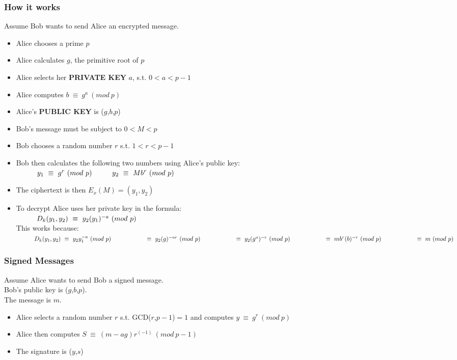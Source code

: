 \documentclass{article}
\newcommand\tabOne[1][1cm]{\hspace*{#1}}
\newcommand\tabTwo[1][2cm]{\hspace*{#1}}
\begin{document}
	\subsubsection{How it works}
	Assume Bob wants to send Alice an encrypted message.
	\begin{itemize}
		\item Alice chooses a prime $p$
		\item Alice calculates $g$, the primitive root of $p$
		\item Alice selects her \textbf{PRIVATE KEY} $a$, s.t. $0<a<p-1$
		\item Alice computes $b~\equiv~g^a~(mod~p)$
		\item Alice's \textbf{PUBLIC KEY} is ($g$,$b$,$p$)
		\item Bob's message must be subject to $0<M<p$
		\item Bob chooses a random number $r$ s.t. $1<r<p-1$
		\item Bob then calculates the following two numbers using Alice's public key:\\
			$
				\tabOne y_1~\equiv~g^r~(mod~p)\\
				\tabOne y_2~\equiv~Mb^r~(mod~p)\\
			$\\
		\item The ciphertext is then $E_x(M)=(y_1,y_2)$
		\item To decrypt Alice uses her private key in the formula:\\
			$
				\tabOne D_k(y_1,y_2)~\equiv~y_2(y_1)^{-a}~(mod~p)\\
			$\\
			This works because:\\
			$
				\tabOne D_k(y_1,y_2)~\equiv~y_2y_1^{-a}~(mod~p)\\
				\tabTwo \equiv~y_2(g)^{-ar}~(mod~p)\\
				\tabTwo \equiv~y_2(g^a)^{-r}~(mod~p)\\
				\tabTwo \equiv~mb^r(b)^{-r}~(mod~p)\\
				\tabTwo \equiv~m~(mod~p)\\
			$
	\end{itemize}
	
	\subsubsection{Signed Messages}
	Assume Alice wants to send Bob a signed message.\\
	Bob's public key is ($g$,$b$,$p$).\\
	The message is $m$.\\
	\begin{itemize}
		\item Alice selects a random number $r$ s.t. GCD($r$,$p-1$)$=1$ and computes $y~\equiv~g^r~(mod~p)$
		\item Alice then computes $S~\equiv~(m-ag)r^(-1)~(mod~p-1)$
		\item The signature is ($y$,$s$)
	\end{itemize}
	
\end{document}
